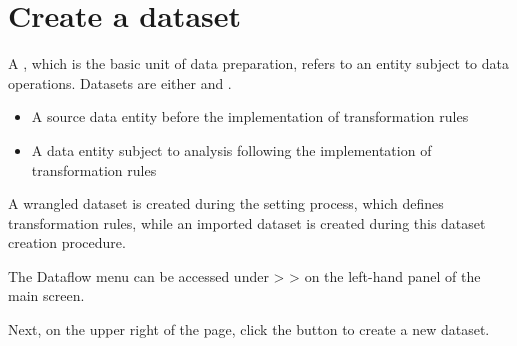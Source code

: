 \documentclass[letterpaper,10pt,english]{sphinxmanual}
\begin{document}
\section{Create a dataset}
\label{\detokenize{discovery/part07/create_a_dataset:id1}}\label{\detokenize{discovery/part07/create_a_dataset::doc}}
A , which is the basic unit of data preparation, refers to an entity subject to data operations. Datasets are either  and .
\begin{itemize}
\item {} 
 A source data entity before the implementation of transformation rules

\item {} 
 A data entity subject to analysis following the implementation of transformation rules

\end{itemize}

A wrangled dataset is created during the  setting process, which defines transformation rules, while an imported dataset is created during this dataset creation procedure.

The Dataflow menu can be accessed under  \textgreater{}  \textgreater{}  on the left-hand panel of the main screen.
\begin{quote}

\begin{figure}[H]
\centering

\noindent{}
\end{figure}
\end{quote}

Next, on the upper right of the  page, click the  button to create a new dataset.
\begin{quote}

\begin{figure}[H]
\centering

\noindent{}
\end{figure}
\end{quote}
\end{document}
